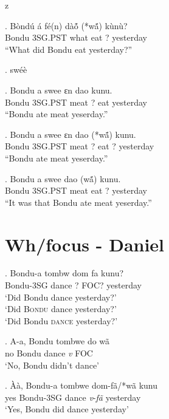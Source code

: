 z   \documentclass{assets/fieldnotes}
\begin{document}
\exg. Bòndú á fé(n) dàó̃ (*wã́) kùnù?\\
Bondu \textsc{3SG.PST} what eat ? yesterday\\
``What did Bondu eat yesterday?''


\ex. swéè

\exg. Bondu a swee ɛn dao kunu.\\
Bondu 3SG.PST meat ? eat yesterday\\
``Bondu ate meat yeserday.''

\exg. Bondu a swee ɛn dao (*wã́) kunu.\\
Bondu 3SG.PST meat ? eat ? yesterday\\
``Bondu ate meat yeserday.''

\exg. Bondu a swee dao (wã́) kunu.\\
Bondu 3SG.PST meat  eat ? yesterday\\
``It was that Bondu ate meat yeserday.''



\section{Wh/focus - Daniel}



\exg. Bondu-a tombw dom fa kunu?\\
Bondu-3SG dance ? FOC? yesterday\\
`Did Bondu dance yesterday?'\\
`Did \textsc{Bondu} dance yesterday?'\\
`Did Bondu \textsc{dance} yesterday?'\\

\exg. A-a, Bondu tombwe do wã\\
no Bondu dance \textit{v} FOC\\
`No, Bondu didn't dance'

\exg. Àà, Bondu-a tombwe dom-fã/*wã kunu\\
yes Bondu-3SG dance \textit{v}-\textit{fã} yesterday\\
`Yes, Bondu did dance yesterday'
\end{document}
